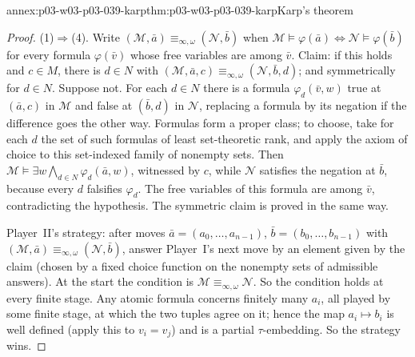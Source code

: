 \begin{annexitem}{annex:p03-w03-p03-039-karp}{thm:p03-w03-p03-039-karp}{Karp's theorem}
\begin{proof}
(1)\(\Rightarrow\)(4). Write \((\mathcal M,\bar a)\equiv_{\infty,\omega}(\mathcal N,\bar b)\)
when \(\mathcal M\models\varphi(\bar a)\Leftrightarrow\mathcal N\models\varphi(\bar b)\)
for every formula \(\varphi(\bar v)\) whose free variables are among
\(\bar v\). Claim: if this holds and \(c\in M\), there is \(d\in N\) with
\((\mathcal M,\bar a,c)\equiv_{\infty,\omega}(\mathcal N,\bar b,d)\); and
symmetrically for \(d\in N\). Suppose not. For each \(d\in N\) there is a
formula \(\varphi_d(\bar v,w)\) true at \((\bar a,c)\) in \(\mathcal M\) and
false at \((\bar b,d)\) in \(\mathcal N\), replacing a formula by its
negation if the difference goes the other way. Formulas form a proper class;
to choose, take for each \(d\) the set of such formulas of least
set-theoretic rank, and apply the axiom of choice to this set-indexed family
of nonempty sets. Then \(\mathcal M\models\exists w\bigwedge_{d\in N}\varphi_d(\bar a,w)\),
witnessed by \(c\), while \(\mathcal N\) satisfies the negation at \(\bar b\),
because every \(d\) falsifies \(\varphi_d\). The free variables of this
formula are among \(\bar v\), contradicting the hypothesis. The symmetric
claim is proved in the same way.

Player~II's strategy: after moves \(\bar a=(a_0,\ldots,a_{n-1})\),
\(\bar b=(b_0,\ldots,b_{n-1})\) with
\((\mathcal M,\bar a)\equiv_{\infty,\omega}(\mathcal N,\bar b)\), answer
Player~I's next move by an element given by the claim (chosen by a fixed
choice function on the nonempty sets of admissible answers). At the start
the condition is \(\mathcal M\equiv_{\infty,\omega}\mathcal N\). So the
condition holds at every finite stage. Any atomic formula concerns finitely
many \(a_i\), all played by some finite stage, at which the two tuples agree
on it; hence the map \(a_i\mapsto b_i\) is well defined (apply this to
\(v_i=v_j\)) and is a partial \(\tau\)-embedding. So the strategy wins.
\end{proof}
\end{annexitem}


